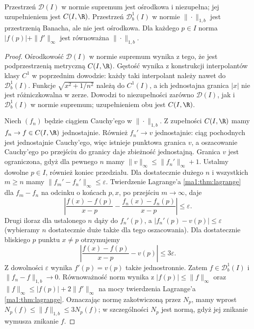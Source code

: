 \begin{twierdzenie}
\label{ma2:thm:bounded-differentiable-banach}
Przestrzeń $\mathcal D(I)$ w normie supremum
jest ośrodkowa i niezupełna; jej uzupełnieniem
jest $C(I,\R)$. Przestrzeń $\mathcal D_b^1(I)$
w normie $\|\cdot\|_{1,b}$ jest przestrzenią
Banacha, ale nie jest ośrodkowa.
Dla każdego $p\in I$ norma
$|f(p)|+\|f'\|_\infty$ jest równoważna
$\|\cdot\|_{1,b}$.
\end{twierdzenie}
\begin{proof}
Ośrodkowość $\mathcal D(I)$ w normie supremum
wynika z tego, że jest podprzestrzenią metryczną
$C(I,\R)$. Gęstość wynika z konstrukcji
interpolantów klasy $C^1$ w poprzednim dowodzie:
każdy taki interpolant należy nawet do
$\mathcal D_b^1(I)$. Funkcje
$\sqrt{x^2+1/n^2}$ należą do $C^1(I)$, a ich
jednostajna granica $|x|$ nie jest różniczkowalna
w zerze. Dowodzi to niezupełności zarówno
$\mathcal D(I)$, jak i $\mathcal D_b^1(I)$
w normie supremum; uzupełnieniem obu jest $C(I,\R)$.

Niech $(f_n)$ będzie ciągiem Cauchy'ego w
$\|\cdot\|_{1,b}$. Z zupełności $C(I,\R)$
mamy $f_n\to f\in C(I,\R)$ jednostajnie.
Również $f_n'\to v$ jednostajnie: ciąg pochodnych
jest jednostajnie Cauchy'ego, więc istnieje
punktowa granica $v$, a oszacowanie Cauchy'ego
po przejściu do granicy daje zbieżność jednostajną.
Granica $v$ jest ograniczona, gdyż dla pewnego $n$
mamy $\|v\|_\infty\le\|f_n'\|_\infty+1$.
Ustalmy dowolne $p\in I$, również koniec przedziału.
Dla dostatecznie dużego $n$ i wszystkich $m\ge n$
mamy $\|f_m'-f_n'\|_\infty\le\varepsilon$.
Twierdzenie Lagrange'a \ref{ma1:thm:lagrange}
dla $f_m-f_n$ na odcinku o końcach $p,x$,
po przejściu $m\to\infty$, daje
\[
 \left|\frac{f(x)-f(p)}{x-p}
 -\frac{f_n(x)-f_n(p)}{x-p}\right|\le\varepsilon .
\]
Drugi iloraz dla ustalonego $n$ dąży do $f_n'(p)$,
a $|f_n'(p)-v(p)|\le\varepsilon$ (wybieramy
$n$ dostatecznie duże także dla tego oszacowania).
Dla dostatecznie bliskiego $p$ punktu $x\ne p$
otrzymujemy
\[
 \left|\frac{f(x)-f(p)}{x-p}-v(p)\right|
 \le 3\varepsilon.
\]
Z dowolności $\varepsilon$ wynika $f'(p)=v(p)$
także jednostronnie. Zatem $f\in\mathcal D_b^1(I)$
i $\|f_n-f\|_{1,b}\to0$.
Równoważność norm wynika z
$|f(p)|\le\|f\|_\infty$ oraz
$\|f\|_\infty\le|f(p)|+2\|f'\|_\infty$
na mocy twierdzenia Lagrange'a \ref{ma1:thm:lagrange}.
Oznaczając normę zakotwiczoną przez $N_p$,
mamy wprost
$N_p(f)\le\|f\|_{1,b}\le3N_p(f)$;
w szczególności $N_p$ jest normą, gdyż jej
znikanie wymusza znikanie $f$.


\end{proof}
